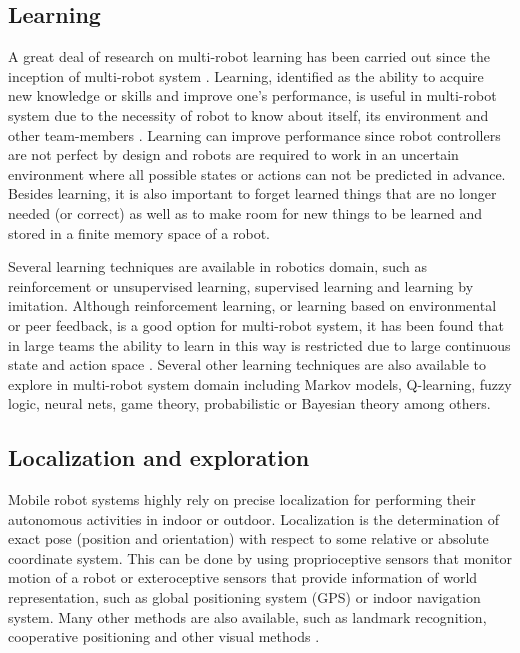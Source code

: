 \subsection*{Learning}
\label{bg:mrs:learn}
A great deal of research on multi-robot learning has been carried out since the inception of multi-robot system \cite{Mataric+2001,Parker1995}. Learning, identified as the ability to acquire new knowledge or skills and improve one's performance, is useful in multi-robot system due to the necessity of robot to know about itself, its environment and other team-members \cite{Mataric2007}. Learning can improve performance since robot controllers are not perfect by design and robots are required to work in an uncertain environment where all possible states or actions can not be predicted in advance. Besides learning, it is also important to forget learned things that are no longer needed (or correct) as well as to make room for new things to be learned and stored in a finite memory space of a robot. 

Several learning techniques are available in robotics domain, such as reinforcement or unsupervised learning, supervised learning and learning by imitation. Although reinforcement learning, or learning based on environmental or peer feedback, is a good option for multi-robot system, it has been found that in large teams the ability to learn in this way is restricted due to large continuous state and action space \cite{Yang+2004}. Several other learning techniques are also available to explore in multi-robot system domain including Markov models, Q-learning, fuzzy logic, neural nets, game theory, probabilistic or Bayesian theory among others. 
\subsection*{Localization and exploration}
\label{bg:mrs:loc}
Mobile robot systems highly rely on precise localization for performing their autonomous activities in indoor or outdoor. Localization is the determination of exact pose (position and orientation) with respect to some relative or absolute coordinate system. This can be done by using proprioceptive sensors that monitor motion of a robot or exteroceptive sensors that provide information of world representation, such as  global positioning system (GPS) or indoor navigation system. Many other methods are also available, such as landmark recognition, cooperative positioning and other visual methods \cite{Arkin+2002}.

